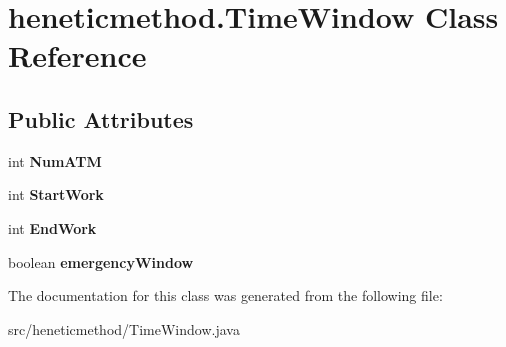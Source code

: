 \hypertarget{classheneticmethod_1_1_time_window}{}\section{heneticmethod.\+Time\+Window Class Reference}
\label{classheneticmethod_1_1_time_window}
\subsection*{Public Attributes}
\begin{DoxyCompactItemize}
\item 
int {\bfseries Num\+A\+TM}\hypertarget{classheneticmethod_1_1_time_window_a1852a016d7e988a0ceae1c7c5640e63f}{}\label{classheneticmethod_1_1_time_window_a1852a016d7e988a0ceae1c7c5640e63f}

\item 
int {\bfseries Start\+Work}\hypertarget{classheneticmethod_1_1_time_window_a00169bf6f60e363a2d51eed36eb43da7}{}\label{classheneticmethod_1_1_time_window_a00169bf6f60e363a2d51eed36eb43da7}

\item 
int {\bfseries End\+Work}\hypertarget{classheneticmethod_1_1_time_window_a6ef8df9b6375ac8737d810c670d643d5}{}\label{classheneticmethod_1_1_time_window_a6ef8df9b6375ac8737d810c670d643d5}

\item 
boolean {\bfseries emergency\+Window}\hypertarget{classheneticmethod_1_1_time_window_a218ceea763da7156a9df07a8d1e2a359}{}\label{classheneticmethod_1_1_time_window_a218ceea763da7156a9df07a8d1e2a359}

\end{DoxyCompactItemize}


The documentation for this class was generated from the following file\+:\begin{DoxyCompactItemize}
\item 
src/heneticmethod/Time\+Window.\+java\end{DoxyCompactItemize}
